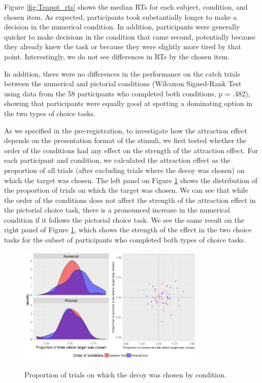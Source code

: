 \documentclass[11pt,a4paper]{article}
\begin{document}
 Figure \ref{fig:Teapot_rts} shows the median RTs for each subject, condition, and chosen item. As expected, participants took substantially longer to make a decision in the numerical condition. In addition, participants were generally quicker to make decisions in the condition that came second, potentially because they already knew the task or because they were slightly more tired by that point. Interestingly, we do not see differences in RTs by the chosen item.

 In addition, there were no differences in the performance on the catch trials between the numerical and pictorial conditions (Wilcoxon Signed-Rank Test using data from the 58 participants who completed both conditions, p = .482), showing that participants were equally good at spotting a dominating option in the two types of choice tasks.

As we specified in the pre-registration, to investigate how the attraction effect depends on the presentation format of the stimuli, we first tested whether the order of the conditions had any effect on the strength of the attraction effect. For each participant and condition, we calculated the attraction effect as the proportion of all trials (after excluding trials where the decoy was chosen) on which the target was chosen. The left panel on Figure \ref{fig:Teapot_condorder} shows the distribution of the proportion of trials on which the target was chosen. We can see that while the order of the conditions does not affect the strength of the attraction effect in the pictorial choice task, there is a pronounced increase in the numerical condition if it follows the pictorial choice task. We see the same result on the right panel of Figure \ref{fig:Teapot_condorder}, which shows the strength of the effect in the two choice tasks for the subset of participants who completed both types of choice tasks.   

\begin{figure}
\centering
\caption{Proportion of trials on which the decoy was chosen by condition.}
\includegraphics[width=0.8\textwidth]{Teapot_condorder.png}
\label{fig:Teapot_condorder}
\end{figure}
\end{document}
